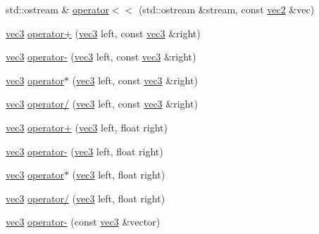 \begin{DoxyCompactItemize}
\item 
std\+::ostream \& \hyperlink{namespacespork_1_1maths_ac11436d48bae0e63231b32507faa5985}{operator$<$$<$} (std\+::ostream \&stream, const \hyperlink{structspork_1_1maths_1_1vec2}{vec2} \&vec)
\item 
\hyperlink{structspork_1_1maths_1_1vec3}{vec3} \hyperlink{namespacespork_1_1maths_af21cd7b96da7a52260534225958cda3c}{operator+} (\hyperlink{structspork_1_1maths_1_1vec3}{vec3} left, const \hyperlink{structspork_1_1maths_1_1vec3}{vec3} \&right)
\item 
\hyperlink{structspork_1_1maths_1_1vec3}{vec3} \hyperlink{namespacespork_1_1maths_ac0ee0df63a5845ab9b5e548234b34628}{operator-\/} (\hyperlink{structspork_1_1maths_1_1vec3}{vec3} left, const \hyperlink{structspork_1_1maths_1_1vec3}{vec3} \&right)
\item 
\hyperlink{structspork_1_1maths_1_1vec3}{vec3} \hyperlink{namespacespork_1_1maths_ada6a3b00d259a40b306b3a42d2b592b1}{operator$\ast$} (\hyperlink{structspork_1_1maths_1_1vec3}{vec3} left, const \hyperlink{structspork_1_1maths_1_1vec3}{vec3} \&right)
\item 
\hyperlink{structspork_1_1maths_1_1vec3}{vec3} \hyperlink{namespacespork_1_1maths_a85ae9110905b8f8a09c369de1837f234}{operator/} (\hyperlink{structspork_1_1maths_1_1vec3}{vec3} left, const \hyperlink{structspork_1_1maths_1_1vec3}{vec3} \&right)
\item 
\hyperlink{structspork_1_1maths_1_1vec3}{vec3} \hyperlink{namespacespork_1_1maths_abac5b30d5be3e3251f9fc2c1c351ebb7}{operator+} (\hyperlink{structspork_1_1maths_1_1vec3}{vec3} left, float right)
\item 
\hyperlink{structspork_1_1maths_1_1vec3}{vec3} \hyperlink{namespacespork_1_1maths_abd740168ef44d890eb3795658292a623}{operator-\/} (\hyperlink{structspork_1_1maths_1_1vec3}{vec3} left, float right)
\item 
\hyperlink{structspork_1_1maths_1_1vec3}{vec3} \hyperlink{namespacespork_1_1maths_ac73b9375d78ee867fb4924d57771c6e1}{operator$\ast$} (\hyperlink{structspork_1_1maths_1_1vec3}{vec3} left, float right)
\item 
\hyperlink{structspork_1_1maths_1_1vec3}{vec3} \hyperlink{namespacespork_1_1maths_ac6eca6058f88e8b4f6c1a5567f109b2c}{operator/} (\hyperlink{structspork_1_1maths_1_1vec3}{vec3} left, float right)
\item 
\hyperlink{structspork_1_1maths_1_1vec3}{vec3} \hyperlink{namespacespork_1_1maths_a7be5d02ef2f6c8395af8a6ecb0aaa382}{operator-\/} (const \hyperlink{structspork_1_1maths_1_1vec3}{vec3} \&vector)

\end{DoxyCompactItemize}
